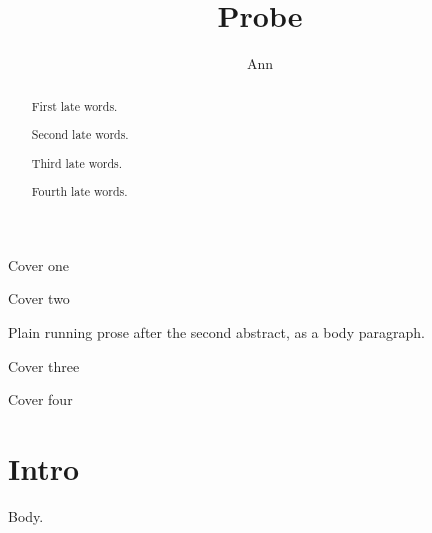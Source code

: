 \documentclass{article}
\begin{document}
\title{Probe}\author{Ann}
\maketitle
\begin{center}Cover one\end{center}
\begin{abstract}First late words.\end{abstract}
\begin{center}Cover two\end{center}
\begin{abstract}Second late words.\end{abstract}
Plain running prose after the second abstract, as a body paragraph.

\begin{center}Cover three\end{center}
\begin{abstract}Third late words.\end{abstract}
\begin{center}Cover four\end{center}
\begin{abstract}Fourth late words.\end{abstract}
\section{Intro}
Body.
\end{document}

